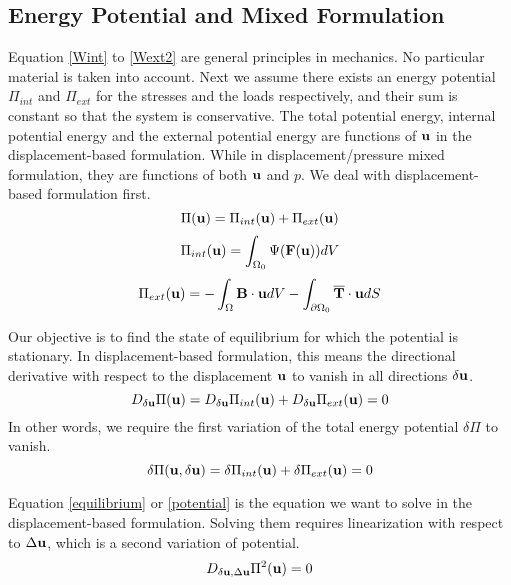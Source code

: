 \subsection{Energy Potential and Mixed Formulation}
Equation \ref{Wint} to \ref{Wext2} are general principles in mechanics. No particular material is taken into account. Next we assume there exists an energy potential $\Pi_{int}$ and $\Pi_{ext}$ for the stresses and the loads respectively, and their sum is constant so that the system is conservative. The total potential energy, internal potential energy and the external potential energy are functions of $\bold{u}$ in the displacement-based  formulation. While in displacement/pressure mixed formulation, they are functions of both $\bold{u}$ and $p$. We deal with displacement-based formulation first.
\begin{equation}
\Pi(\bold{u}) = \Pi_{int}(\bold{u}) + \Pi_{ext}(\bold{u})
\end{equation}
\begin{equation} \label{pint}
\Pi_{int}(\bold{u}) = \int_{\Omega_{0}}\Psi(\bold{F}(\bold{u}))dV
\end{equation}
\begin{equation} \label{pext}
\Pi_{ext}(\bold{u}) =  - \int_\Omega\bold{B}\cdot\bold{u}dV -  \int_{\partial{\Omega_0}}\overline{\bold{T}}\cdot{\bold{u}}dS
\end{equation}

Our objective is to find the state of equilibrium for which the potential is stationary. In displacement-based formulation, this means the directional derivative with respect to the displacement $\bold{u}$ to vanish in all directions $\delta{\bold{u}}$.
\begin{equation} \label{equilibrium}
D_{\delta\bold{u}}\Pi(\bold{u}) = D_{\delta\bold{u}}\Pi_{int}(\bold{u}) + D_{\delta\bold{u}}\Pi_{ext}(\bold{u}) = 0
\end{equation} 
 In other words, we require the first variation of the total energy potential $\delta\Pi$ to vanish.
 \begin{equation} \label{potential}
\delta\Pi(\bold{u}, \delta\bold{u}) =\delta\Pi_{int}(\bold{u}) + \delta\Pi_{ext}(\bold{u}) = 0
\end{equation}

Equation \ref{equilibrium} or \ref{potential} is the equation we want to solve in the displacement-based formulation. Solving them requires linearization with respect to $\Delta{\bold{u}}$, which is a second variation of potential. 
\begin{equation} \label{matrix2}
D_{\delta\bold{u}, \Delta\bold{u}}\Pi^2(\bold{u}) = 0
\end{equation}


